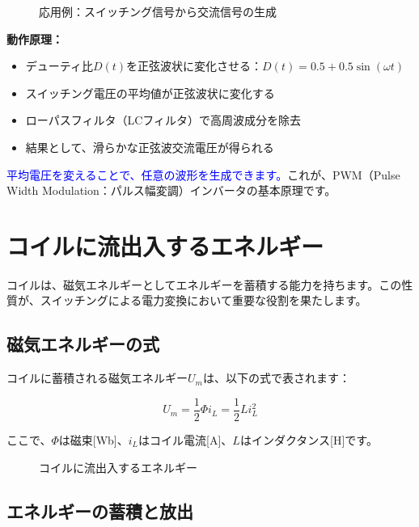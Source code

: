 \begin{figure}[H]
\centering
{}
\caption{応用例：スイッチング信号から交流信号の生成}
\label{fig:ch04_ac_generation}
\end{figure}

\textbf{動作原理：}

\begin{itemize}
\item デューティ比$D(t)$を正弦波状に変化させる：$D(t) = 0.5 + 0.5\sin(\omega t)$
\item スイッチング電圧の平均値が正弦波状に変化する
\item ローパスフィルタ（LCフィルタ）で高周波成分を除去
\item 結果として、滑らかな正弦波交流電圧が得られる
\end{itemize}

\textcolor{blue}{平均電圧を変えることで、任意の波形を生成できます。}これが、PWM（Pulse Width Modulation：パルス幅変調）インバータの基本原理です。

\section{コイルに流出入するエネルギー}

コイルは、磁気エネルギーとしてエネルギーを蓄積する能力を持ちます。この性質が、スイッチングによる電力変換において重要な役割を果たします。

\subsection{磁気エネルギーの式}

コイルに蓄積される磁気エネルギー$U_m$は、以下の式で表されます：

\begin{equation}
\boxed{U_m = \frac{1}{2}\Phi i_L = \frac{1}{2}Li_L^2}
\end{equation}

ここで、$\Phi$は磁束[Wb]、$i_L$はコイル電流[A]、$L$はインダクタンス[H]です。

\begin{figure}[H]
\centering
{}
\caption{コイルに流出入するエネルギー}
\label{fig:ch04_inductor_energy}
\end{figure}

\subsection{エネルギーの蓄積と放出}

